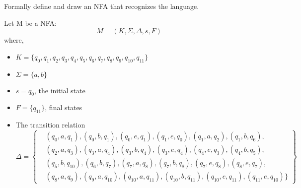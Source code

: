 Formally define and draw an NFA that recognizes the language.

Let M be a NFA:
\begin{equation*}
  M = (K, \Sigma, \Delta, s, F)
\end{equation*}
where,
\begin{itemize}
  \item $K = \{ q_{0}, q_{1}, q_{2}, q_{3}, q_{4}, q_{5}, q_{6}, q_{7}, q_{8}, q_{9}, q_{10}, q_{11} \}$
  \item $\Sigma = \{ a, b \}$
  \item $s = q_0$, the initial state
  \item $F = \{ q_{11} \}$, final states
  \item The transition relation$\Delta = \left\{ \begin{aligned}
      &(q_0, a, q_1), (q_0, b, q_1), (q_0, e, q_1), (q_1, e, q_0), (q_1, a, q_2), (q_1, b, q_6),\\
      &(q_2, a, q_3), (q_3, a, q_4), (q_3, b, q_4), (q_3, e, q_4), (q_4, e, q_3), (q_4, b, q_5),\\
      &(q_5, b, q_{10}), (q_6, b, q_7), (q_7, a, q_8), (q_7, b, q_8), (q_7, e, q_8), (q_8, e, q_7),\\
      &(q_8, a, q_9), (q_9, a, q_{10}), (q_{10}, a, q_{11}), (q_{10}, b, q_{11}), (q_{10}, e, q_{11}), (q_{11}, e, q_{10}) \}
    \end{aligned} \right\}$
\end{itemize}

